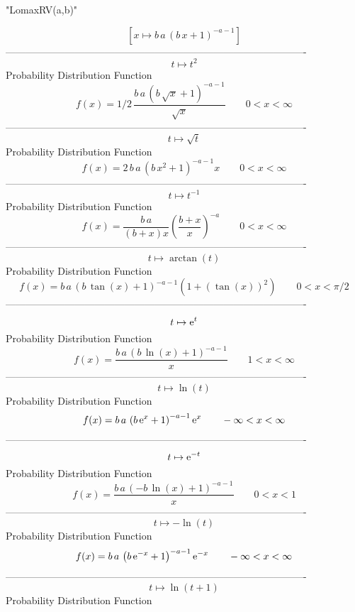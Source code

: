 \documentclass[12pt]{article}
\begin{document}
 
                               "LomaxRV(a,b)"

$$[x\mapsto b\,a\, \left( b\,x+1 \right) ^{-a-1}]
$$-------------------------------------------------------------------------------------------  \\$$t\mapsto {t}^{2}
$$Probability Distribution Function 
$$  f(x)=1/2\,{\frac {b\,a\, \left( b\,\sqrt {x}+1 \right) ^{-a-1}}{\sqrt {x}}}
 \qquad0
 < x < \infty 
$$-------------------------------------------------------------------------------------------  \\$$t\mapsto \sqrt {t}
$$Probability Distribution Function 
$$  f(x)=2\,b\,a\, \left( b\,{x}^{2}+1 \right) ^{-a-1}x
 \qquad0
 < x < \infty 
$$-------------------------------------------------------------------------------------------  \\$$t\mapsto {t}^{-1}
$$Probability Distribution Function 
$$  f(x)={\frac {b\,a}{ \left( b+x \right) x} \left( {\frac {b+x}{x}} \right) ^
{-a}}
 \qquad0
 < x < \infty 
$$-------------------------------------------------------------------------------------------  \\$$t\mapsto \arctan \left( t \right) 
$$Probability Distribution Function 
$$  f(x)=b\,a\, \left( b\,\tan \left( x \right) +1 \right) ^{-a-1} \left( 1+
 \left( \tan \left( x \right)  \right) ^{2} \right) 
 \qquad0
 < x < \pi/2
$$-------------------------------------------------------------------------------------------  \\$$t\mapsto {{\rm e}^{t}}
$$Probability Distribution Function 
$$  f(x)={\frac {b\,a\, \left( b\,\ln  \left( x \right) +1 \right) ^{-a-1}}{x}}
 \qquad1
 < x < \infty 
$$-------------------------------------------------------------------------------------------  \\$$t\mapsto \ln  \left( t \right) 
$$Probability Distribution Function 
$$  f(x)=b\,a\, \left( b\,{{\rm e}^{x}}+1 \right) ^{-a-1}{{\rm e}^{x}}
 \qquad-\infty 
 < x < \infty 
$$-------------------------------------------------------------------------------------------  \\$$t\mapsto {{\rm e}^{-t}}
$$Probability Distribution Function 
$$  f(x)={\frac {b\,a\, \left( -b\,\ln  \left( x \right) +1 \right) ^{-a-1}}{x}
}
 \qquad0
 < x < 1
$$-------------------------------------------------------------------------------------------  \\$$t\mapsto -\ln  \left( t \right) 
$$Probability Distribution Function 
$$  f(x)=b\,a\, \left( b\,{{\rm e}^{-x}}+1 \right) ^{-a-1}{{\rm e}^{-x}}
 \qquad-\infty 
 < x < \infty 
$$-------------------------------------------------------------------------------------------  \\$$t\mapsto \ln  \left( t+1 \right) 
$$Probability Distribution Function 
\end{document}
